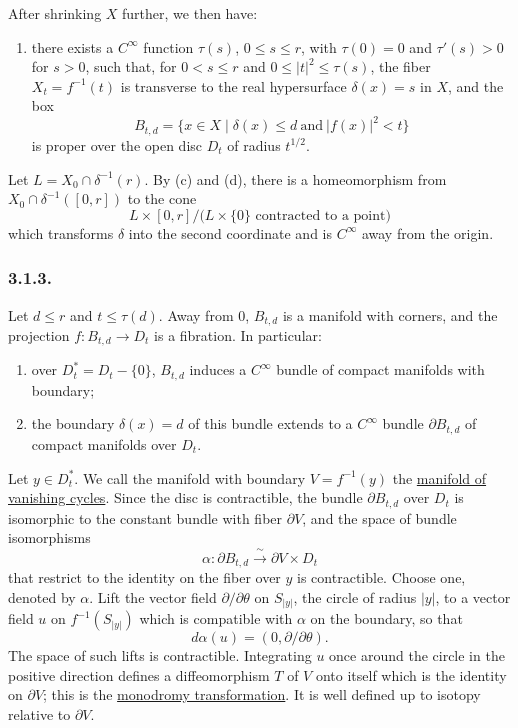 After shrinking $X$ further, we then have:

\begin{enumerate}[label=(\alph*),start=5]
\item there exists a $C^\infty$ function $\tau(s)$, $0\leq s\leq r$,
  with $\tau(0)=0$ and $\tau'(s)>0$ for $s>0$, such that, for
  $0<s\leq r$ and $0\leq |t|^2\leq\tau(s)$, the fiber
  $X_t=f^{-1}(t)$ is transverse to the real hypersurface
  $\delta(x)=s$ in $X$, and the box
  \[
  B_{t,d}=\{x\in X\mid \delta(x)\leq d\ \text{and}\ |f(x)|^2<t\}
  \]
  is proper over the open disc $D_t$ of radius $t^{1/2}$.
\end{enumerate}

Let $L=X_0\cap\delta^{-1}(r)$.  By (c) and (d), there is a
homeomorphism from $X_0\cap\delta^{-1}([0,r])$ to the cone
\[
L\times[0,r]\big/\bigl(L\times\{0\}\text{ contracted to a point}\bigr)
\]
which transforms $\delta$ into the second coordinate and is
$C^\infty$ away from the origin.

\subsubsection*{3.1.3.}
Let $d\leq r$ and $t\leq\tau(d)$.  Away from $0$, $B_{t,d}$ is a
manifold with corners, and the projection $f:B_{t,d}\to D_t$ is a
fibration.  In particular:

\begin{enumerate}[label=(\alph*)]
\item over $D_t^*=D_t-\{0\}$, $B_{t,d}$ induces a $C^\infty$ bundle
  of compact manifolds with boundary;
\item the boundary $\delta(x)=d$ of this bundle extends to a
  $C^\infty$ bundle $\partial B_{t,d}$ of compact manifolds over
  $D_t$.
\end{enumerate}

Let $y\in D_t^*$.  We call the manifold with boundary
$V=f^{-1}(y)$ the \underline{manifold of vanishing cycles}.  Since the
disc is contractible, the bundle $\partial B_{t,d}$ over $D_t$ is
isomorphic to the constant bundle with fiber $\partial V$, and the
space of bundle isomorphisms
\[
\alpha:\partial B_{t,d}\xrightarrow{\ \sim\ }\partial V\times D_t
\]
that restrict to the identity on the fiber over $y$ is contractible.
Choose one, denoted by $\alpha$.  Lift the vector field
$\partial/\partial\theta$ on $S_{|y|}$, the circle of radius $|y|$,
to a vector field $u$ on $f^{-1}(S_{|y|})$ which is compatible with
$\alpha$ on the boundary, so that
\[
d\alpha(u)=(0,\partial/\partial\theta).
\]
The space of such lifts is contractible.  Integrating $u$ once around
the circle in the positive direction defines a diffeomorphism $T$ of
$V$ onto itself which is the identity on $\partial V$; this is the
\underline{monodromy transformation}.  It is well defined up to
isotopy relative to $\partial V$.

